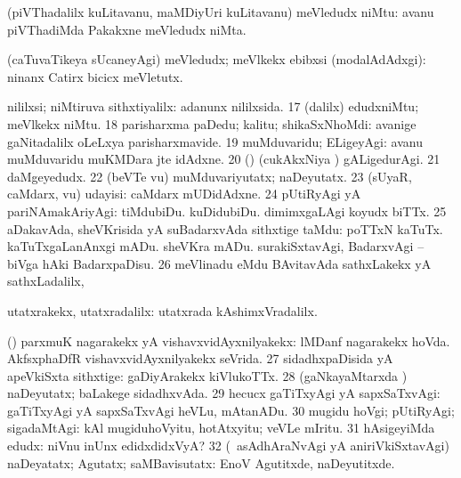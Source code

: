 {{ (piVThadalilx kuLitavanu, maMDiyUri kuLitavanu) meVledudx niMtu:  avanu piVThadiMda Pakakxne meVledudx niMta. 

 (caTuvaTikeya sUcaneyAgi) meVledudx; meVlkekx ebibxsi
(modalAdAdxgi):  ninanx Catirx bicicx meVletutx. 

 nililxsi; niMtiruva sithxtiyalilx:  adanunx nililxsida. 
\num{17} (\BAavayx dalilx) edudxniMtu; meVlkekx niMtu. 
\num{18} parisharxma paDedu; kalitu; shikaSxNhoMdi:  avanige gaNitadalilx oLeLxya parisharxmavide. 
\num{19} muMduvaridu; ELigeyAgi:  avanu muMduvaridu muKMDara jte idAdxne. 
\num{20} (\nw) (cukAkxNiya \vi) gALigedurAgi. 
\num{21} daMgeyedudx. 
\num{22} (beVTe \mo vu) muMduvariyutatx; naDeyutatx. 
\num{23} (sUyaR, caMdarx, \mo vu) udayisi:  caMdarx mUDidAdxne. 
\num{24} pUtiRyAgi yA pariNAmakAriyAgi:  tiMdubiDu.  kuDidubiDu.  dimimxgaLAgi koyudx biTTx. 
\num{25} aDakavAda, sheVKrisida yA suBadarxvAda sithxtige taMdu:  poTTxN kaTuTx.  kaTuTxgaLanAnxgi mADu.  sheVKra mADu.  surakiSxtavAgi, BadarxvAgi -- biVga hAki BadarxpaDisu. 
\num{26} meVlinadu eMdu BAvitavAda sathxLakekx yA sathxLadalilx, \kanmu\ 

 utatxrakekx, utatxradalilx:  utatxrada kAshimxVradalilx. 

 (\birx) parxmuK nagarakekx yA vishavxvidAyxnilyakekx:
 lMDanf nagarakekx hoVda.  AkfsxphaDfR vishavxvidAyxnilyakekx seVrida.  
\num{27} sidadhxpaDisida yA apeVkiSxta sithxtige:  gaDiyArakekx kiVlukoTTx. 
\num{28} (gaNkayaMtarxda \vi) naDeyutatx; baLakege sidadhxvAda. 
\num{29} hecucx gaTiTxyAgi yA sapxSaTxvAgi:  gaTiTxyAgi yA sapxSaTxvAgi heVLu, mAtanADu. 
\num{30} mugidu hoVgi; pUtiRyAgi; sigadaMtAgi:  kAl mugiduhoVyitu, hotAtxyitu; veVLe mIritu. 
\num{31} hAsigeyiMda edudx:  niVnu inUnx edidxdidxVyA? 
\num{32} (\kanmu\ asAdhAraNvAgi yA aniriVkiSxtavAgi) naDeyatatx; Agutatx; saMBavisutatx:  EnoV Agutitxde, naDeyutitxde.}}

